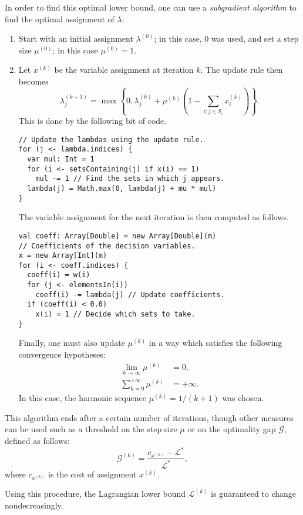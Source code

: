 \documentclass[journal]{IEEEtran}
\newcommand{\lagr}{\mathscr{L}}
\begin{document}
In order to find this optimal lower bound, one can use a \emph{subgradient algorithm} to find the optimal assignment of \(\lambda\):
\begin{enumerate}
	\item Start with an initial assignment \(\lambda^{(0)}\); in this case, \(0\) was used, and set a step size \(\mu^{(0)}\); in this case \(\mu^{(0)} = 1\).
	\item Let \(x^{(k)}\) be the variable assignment at iteration \(k\).
	The update rule then becomes
	\[
	\lambda_j^{(k+1)} = \max\left\{0, \lambda_j^{(k)} + \mu^{(k)} \left(1 - \sum_{i : j \in \mathcal{S}_i} x_i^{(k)}\right)\right\}.
	\]
	This is done by the following bit of code.
\begin{verbatim}
// Update the lambdas using the update rule.
for (j <- lambda.indices) {
  var mul: Int = 1
  for (i <- setsContaining(j) if x(i) == 1)
    mul -= 1 // Find the sets in which j appears.
  lambda(j) = Math.max(0, lambda(j) + mu * mul)
}
\end{verbatim}

	The variable assignment for the next iteration is then computed as follows.
\begin{verbatim}
val coeff: Array[Double] = new Array[Double](m)
// Coefficients of the decision variables.
x = new Array[Int](m)
for (i <- coeff.indices) {
  coeff(i) = w(i)
  for (j <- elementsIn(i))
    coeff(i) -= lambda(j) // Update coefficients.
  if (coeff(i) < 0.0)
    x(i) = 1 // Decide which sets to take.
}
\end{verbatim}
	
	Finally, one must also update \(\mu^{(k)}\) in a way which satisfies the following convergence hypotheses:
	\begin{align*}
	\lim_{k \to \infty} \mu^{(k)} &= 0, \\
	\sum_{k = 0}^{+\infty} \mu^{(k)} &= +\infty.
	\end{align*}
	In this case, the harmonic sequence \(\mu^{(k)} = 1/(k+1)\) was chosen.
\end{enumerate}
This algorithm ends after a certain number of iterations, though other measures can be used such as a threshold on the step size \(\mu\) or on the optimality gap \(\mathscr{G}\), defined as follows:
\[
\mathscr{G}^{(k)} = \frac{c_{x^{(k)}} - \lagr^*}{\lagr^*},
\]
where \(c_{x^{(k)}}\) is the cost of assignment \(x^{(k)}\).

Using this procedure, the Lagrangian lower bound \(\mathscr{L}^{(k)}\) is guaranteed to change nondecreasingly.
\end{document}

